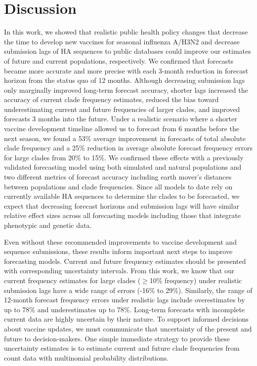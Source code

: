 \documentclass[9pt,lineno]{elife}
\begin{document}
\section{Discussion}

In this work, we showed that realistic public health policy changes that decrease the time to develop new vaccines for seasonal influenza A/H3N2 and decrease submission lags of HA sequences to public databases could improve our estimates of future and current populations, respectively.
We confirmed that forecasts became more accurate and more precise with each 3-month reduction in forecast horizon from the status quo of 12 months.
Although decreasing submission lags only marginally improved long-term forecast accuracy, shorter lags increased the accuracy of current clade frequency estimates, reduced the bias toward underestimating current and future frequencies of larger clades, and improved forecasts 3 months into the future.
Under a realistic scenario where a shorter vaccine development timeline allowed us to forecast from 6 months before the next season, we found a 53\% average improvement in forecasts of total absolute clade frequency and a 25\% reduction in average absolute forecast frequency errors for large clades from 20\% to 15\%.
We confirmed these effects with a previously validated forecasting model using both simulated and natural populations and two different metrics of forecast accuracy including earth mover's distances between populations and clade frequencies.
Since all models to date rely on currently available HA sequences to determine the clades to be forecasted, we expect that decreasing forecast horizons and submission lags will have similar relative effect sizes across all forecasting models including those that integrate phenotypic and genetic data.

Even without these recommended improvements to vaccine development and sequence submissions, these results inform important next steps to improve forecasting models.
Current and future frequency estimates should be presented with corresponding uncertainty intervals.
From this work, we know that our current frequency estimates for large clades ($\ge$10\% frequency) under realistic submission lags have a wide range of errors (-16\% to 29\%).
Similarly, the range of 12-month forecast frequency errors under realistic lags include overestimates by up to 78\% and underestimates up to 78\%.
Long-term forecasts with incomplete current data are highly uncertain by their nature.
To support informed decisions about vaccine updates, we must communicate that uncertainty of the present and future to decision-makers.
One simple immediate strategy to provide these uncertainty estimates is to estimate current and future clade frequencies from count data with multinomial probability distributions.
\end{document}
